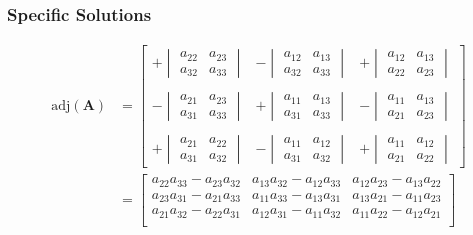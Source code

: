 \subsubsection{Specific Solutions}
\noindent\begin{align*}
    \mathrm{adj}(\mathbf{A}) & = \begin{bmatrix}
                                     +\begin{vmatrix}a_{22}&a_{23}\\a_{32}&a_{33}\end{vmatrix} & -\begin{vmatrix}a_{12}&a_{13}\\a_{32}&a_{33}\end{vmatrix} & +\begin{vmatrix}a_{12}&a_{13}\\a_{22}&a_{23}\end{vmatrix} \\\\
                                     -\begin{vmatrix}a_{21}&a_{23}\\a_{31}&a_{33}\end{vmatrix} & +\begin{vmatrix}a_{11}&a_{13}\\a_{31}&a_{33}\end{vmatrix} & -\begin{vmatrix}a_{11}&a_{13}\\a_{21}&a_{23}\end{vmatrix} \\\\
                                     +\begin{vmatrix}a_{21}&a_{22}\\a_{31}&a_{32}\end{vmatrix} & -\begin{vmatrix}a_{11}&a_{12}\\a_{31}&a_{32}\end{vmatrix} & +\begin{vmatrix}a_{11}&a_{12}\\a_{21}&a_{22}\end{vmatrix}
                                 \end{bmatrix} \\
                             & = \begin{bmatrix}
                                     a_{22}a_{33}-a_{23}a_{32} & a_{13}a_{32}-a_{12}a_{33} & a_{12}a_{23}-a_{13}a_{22} \\
                                     a_{23}a_{31}-a_{21}a_{33} & a_{11}a_{33}-a_{13}a_{31} & a_{13}a_{21}-a_{11}a_{23} \\
                                     a_{21}a_{32}-a_{22}a_{31} & a_{12}a_{31}-a_{11}a_{32} & a_{11}a_{22}-a_{12}a_{21} \\
                                 \end{bmatrix}
\end{align*}

